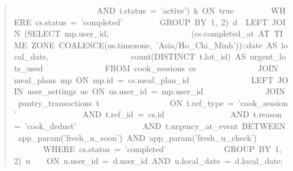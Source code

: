 \begin{quote}
\ \ \ \ \ \ \ \ \ \ \ \ \ \ \ \ \ \ \ \ AND\ i.status\ =\ 'active')\ k\ ON\ true\newline{}\ \ \ \ \ \ \ \ \ WHERE\ cs.status\ =\ 'completed'\newline{}\ \ \ \ \ \ \ \ \ GROUP\ BY\ 1,\ 2)\ d\newline{}\ \ LEFT\ JOIN\ (SELECT\ mp.user\_\allowbreak{}id,\newline{}\ \ \ \ \ \ \ \ \ \ \ \ \ \ \ \ \ \ \ \ (cs.completed\_\allowbreak{}at\ AT\ TIME\ ZONE\ COALESCE(us.timezone,\ 'Asia/\allowbreak{}Ho\_\allowbreak{}Chi\_\allowbreak{}Minh'))::date\ AS\ local\_\allowbreak{}date,\newline{}\ \ \ \ \ \ \ \ \ \ \ \ \ \ \ \ \ \ \ \ count(DISTINCT\ t.lot\_\allowbreak{}id)\ AS\ urgent\_\allowbreak{}lots\_\allowbreak{}used\newline{}\ \ \ \ \ \ \ \ \ \ \ \ \ \ \ FROM\ cook\_\allowbreak{}sessions\ cs\newline{}\ \ \ \ \ \ \ \ \ \ \ \ \ \ \ JOIN\ meal\_\allowbreak{}plans\ mp\ ON\ mp.id\ =\ cs.meal\_\allowbreak{}plan\_\allowbreak{}id\newline{}\ \ \ \ \ \ \ \ \ \ \ \ \ \ \ LEFT\ JOIN\ user\_\allowbreak{}settings\ us\ ON\ us.user\_\allowbreak{}id\ =\ mp.user\_\allowbreak{}id\newline{}\ \ \ \ \ \ \ \ \ \ \ \ \ \ \ JOIN\ pantry\_\allowbreak{}transactions\ t\newline{}\ \ \ \ \ \ \ \ \ \ \ \ \ \ \ \ \ ON\ t.ref\_\allowbreak{}type\ =\ 'cook\_\allowbreak{}session'\newline{}\ \ \ \ \ \ \ \ \ \ \ \ \ \ \ \ AND\ t.ref\_\allowbreak{}id\ =\ cs.id\newline{}\ \ \ \ \ \ \ \ \ \ \ \ \ \ \ \ AND\ t.reason\ =\ 'cook\_\allowbreak{}deduct'\newline{}\ \ \ \ \ \ \ \ \ \ \ \ \ \ \ \ AND\ t.urgency\_\allowbreak{}at\_\allowbreak{}event\ BETWEEN\ app\_\allowbreak{}param('fresh\_\allowbreak{}u\_\allowbreak{}soon')\ AND\ app\_\allowbreak{}param('fresh\_\allowbreak{}u\_\allowbreak{}check')\newline{}\ \ \ \ \ \ \ \ \ \ \ \ \ \ WHERE\ cs.status\ =\ 'completed'\newline{}\ \ \ \ \ \ \ \ \ \ \ \ \ \ GROUP\ BY\ 1,\ 2)\ u\newline{}\ \ \ \ ON\ u.user\_\allowbreak{}id\ =\ d.user\_\allowbreak{}id\ AND\ u.local\_\allowbreak{}date\ =\ d.local\_\allowbreak{}date;
\end{quote}
